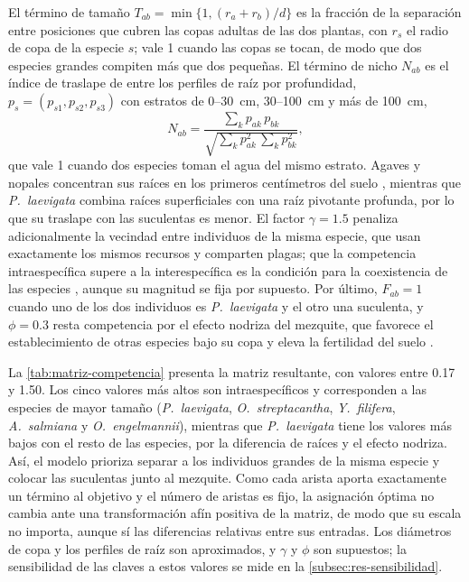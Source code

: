 El término de tamaño $T_{ab}=\min\{1,(r_a+r_b)/d\}$ es la fracción de la separación entre posiciones que cubren las copas adultas de las dos plantas, con $r_s$ el radio de copa de la especie $s$; vale 1 cuando las copas se tocan, de modo que dos especies grandes compiten más que dos pequeñas. El término de nicho $N_{ab}$ es el índice de traslape de \textcite{pianka1973} entre los perfiles de raíz por profundidad, $p_s=(p_{s1},p_{s2},p_{s3})$ con estratos de 0--30~cm, 30--100~cm y más de 100~cm,
\begin{equation}
N_{ab}=\frac{\sum_k p_{ak}\,p_{bk}}{\sqrt{\sum_k p_{ak}^2\,\sum_k p_{bk}^2}},
\end{equation}
que vale 1 cuando dos especies toman el agua del mismo estrato. Agaves y nopales concentran sus raíces en los primeros centímetros del suelo \autocite{snyman2006}, mientras que \textit{P.~laevigata} combina raíces superficiales con una raíz pivotante profunda, por lo que su traslape con las suculentas es menor. El factor $\gamma=1.5$ penaliza adicionalmente la vecindad entre individuos de la misma especie, que usan exactamente los mismos recursos y comparten plagas; que la competencia intraespecífica supere a la interespecífica es la condición para la coexistencia de las especies \autocite{chesson2000}, aunque su magnitud se fija por supuesto. Por último, $F_{ab}=1$ cuando uno de los dos individuos es \textit{P.~laevigata} y el otro una suculenta, y $\phi=0.3$ resta competencia por el efecto nodriza del mezquite, que favorece el establecimiento de otras especies bajo su copa \autocite{flores2003,padilla2006} y eleva la fertilidad del suelo \autocite{garciasanchez2012}.

La \cref{tab:matriz-competencia} presenta la matriz resultante, con valores entre 0.17 y 1.50. Los cinco valores más altos son intraespecíficos y corresponden a las especies de mayor tamaño (\textit{P.~laevigata}, \textit{O.~streptacantha}, \textit{Y.~filifera}, \textit{A.~salmiana} y \textit{O.~engelmannii}), mientras que \textit{P.~laevigata} tiene los valores más bajos con el resto de las especies, por la diferencia de raíces y el efecto nodriza. Así, el modelo prioriza separar a los individuos grandes de la misma especie y colocar las suculentas junto al mezquite. Como cada arista aporta exactamente un término al objetivo y el número de aristas es fijo, la asignación óptima no cambia ante una transformación afín positiva de la matriz, de modo que su escala no importa, aunque sí las diferencias relativas entre sus entradas. Los diámetros de copa y los perfiles de raíz son aproximados, y $\gamma$ y $\phi$ son supuestos; la sensibilidad de las claves a estos valores se mide en la \cref{subsec:res-sensibilidad}.

